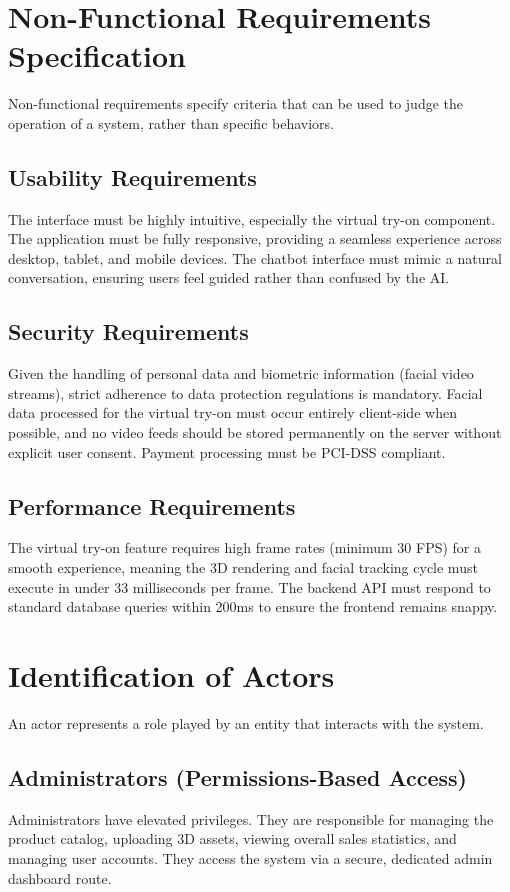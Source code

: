 \section{Non-Functional Requirements Specification}
\label{sec:req_nonfunctional}
Non-functional requirements specify criteria that can be used to judge the operation of a system, rather than specific behaviors.

\subsection{Usability Requirements}
The interface must be highly intuitive, especially the virtual try-on component. The application must be fully responsive, providing a seamless experience across desktop, tablet, and mobile devices. The chatbot interface must mimic a natural conversation, ensuring users feel guided rather than confused by the AI.

\subsection{Security Requirements}
Given the handling of personal data and biometric information (facial video streams), strict adherence to data protection regulations is mandatory. Facial data processed for the virtual try-on must occur entirely client-side when possible, and no video feeds should be stored permanently on the server without explicit user consent. Payment processing must be PCI-DSS compliant.

\subsection{Performance Requirements}
The virtual try-on feature requires high frame rates (minimum 30 FPS) for a smooth experience, meaning the 3D rendering and facial tracking cycle must execute in under 33 milliseconds per frame. The backend API must respond to standard database queries within 200ms to ensure the frontend remains snappy.

\section{Identification of Actors}
\label{sec:req_actors}
An actor represents a role played by an entity that interacts with the system.

\subsection{Administrators (Permissions-Based Access)}
Administrators have elevated privileges. They are responsible for managing the product catalog, uploading 3D assets, viewing overall sales statistics, and managing user accounts. They access the system via a secure, dedicated admin dashboard route.

